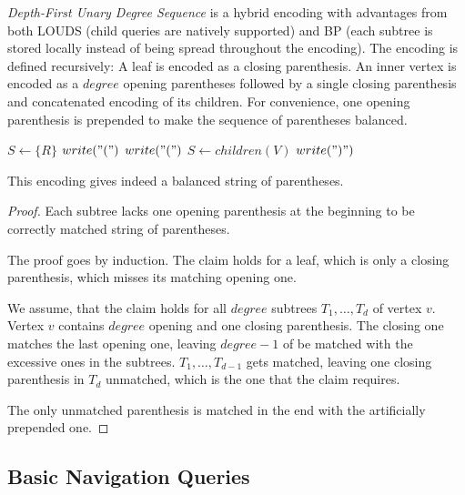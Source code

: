 \emph{Depth-First Unary Degree Sequence} is a hybrid encoding with advantages from both LOUDS (child queries are natively supported) and BP (each subtree is stored locally instead of being spread throughout the encoding).
The encoding is defined recursively:
A leaf is encoded as a closing parenthesis.
An inner vertex is encoded as a $degree$ opening parentheses followed by a single closing parenthesis and concatenated encoding of its children.
For convenience, one opening parenthesis is prepended to make the sequence of parentheses balanced.


\begin{algorithmic}
	\State $S \gets \{R\}$ 
	\State $write("(")$
				\State $write("(")$
			\EndFor
			\State $ S \gets children(V)$
			\State $write(")")$
	\EndWhile
\EndFunction
\end{algorithmic}

\begin{lemma}
	This encoding gives indeed a balanced string of parentheses.
\end{lemma}
\begin{proof}
	Each subtree lacks one opening parenthesis at the beginning to be correctly matched string of parentheses.
	
	The proof goes by induction.
	The claim holds for a leaf, which is only a closing parenthesis, which misses its matching opening one.
	
	We assume, that the claim holds for all $degree$ subtrees $T_1, \ldots, T_d$ of vertex $v$.
	Vertex $v$ contains $degree$ opening and one closing parenthesis.
	The closing one matches the last opening one, leaving $degree - 1$ of be matched with the excessive ones in the subtrees.
	$T_1, \ldots, T_{d-1}$ gets matched, leaving one closing parenthesis in $T_d$ unmatched, which is the one that the claim requires.
	
	The only unmatched parenthesis is matched in the end with the artificially prepended one.
\end{proof}

\subsection{Basic Navigation Queries}

